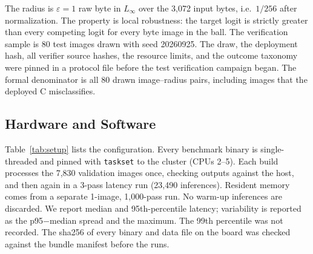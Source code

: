 The radius is $\varepsilon = 1$ raw byte in $L_\infty$ over the 3,072 input bytes, i.e.\ $1/256$ after normalization. The property is local robustness: the target logit is strictly greater than every competing logit for every byte image in the ball. The verification sample is 80 test images drawn with seed 20260925. The draw, the deployment hash, all verifier source hashes, the resource limits, and the outcome taxonomy were pinned in a protocol file before the test verification campaign began. The formal denominator is all 80 drawn image--radius pairs, including images that the deployed C misclassifies.

\subsection{Hardware and Software}

Table~\ref{tab:setup} lists the configuration. Every benchmark binary is single-threaded and pinned with \texttt{taskset} to the \Aseven{} cluster (CPUs 2--5). Each build processes the 7,830 validation images once, checking outputs against the host, and then again in a 3-pass latency run (23,490 inferences). Resident memory comes from a separate 1-image, 1,000-pass run. No warm-up inferences are discarded. We report median and 95th-percentile latency; variability is reported as the p95$-$median spread and the maximum. The 99th percentile was not recorded. The sha256 of every binary and data file on the board was checked against the bundle manifest before the runs.

